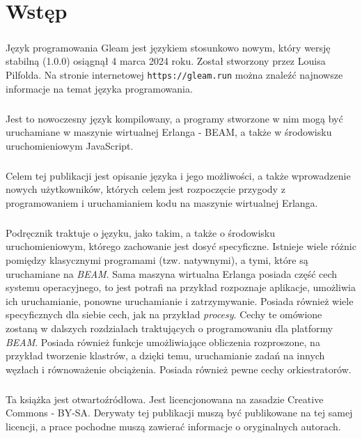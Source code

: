 \chapter{Wstęp}
\paragraph{} Język programowania Gleam jest językiem stosunkowo nowym, który wersję stabilną (1.0.0) osiągnął 4 marca 2024 roku. Został stworzony przez Louisa Pilfolda. Na stronie internetowej  \texttt{https://gleam.run} można znaleźć najnowsze informacje na temat języka programowania.
\paragraph{} Jest to nowoczesny język kompilowany, a programy stworzone w nim mogą być uruchamiane w maszynie wirtualnej Erlanga - BEAM, a także w środowisku uruchomieniowym JavaScript.
\paragraph{} Celem tej publikacji jest opisanie języka i jego możliwości, a także wprowadzenie nowych użytkowników, których celem jest rozpoczęcie przygody z programowaniem i uruchamianiem kodu na maszynie wirtualnej Erlanga. 
\paragraph{} Podręcznik traktuje o języku, jako takim, a także o środowisku uruchomieniowym, którego zachowanie jest dosyć specyficzne. Istnieje wiele różnic pomiędzy klasycznymi programami (tzw. natywnymi), a tymi, które są uruchamiane na \textit{BEAM}. Sama maszyna wirtualna Erlanga posiada część cech systemu operacyjnego, to jest potrafi na przykład rozpoznaje aplikacje, umożliwia ich uruchamianie, ponowne uruchamianie i zatrzymywanie. Posiada również wiele specyficznych dla siebie cech, jak na przykład \textit{procesy}. Cechy te omówione zostaną w dalszych rozdziałach traktujących o programowaniu dla platformy \textit{BEAM}. Posiada również funkcje umożliwiające obliczenia rozproszone, na przykład tworzenie klastrów, a dzięki temu, uruchamianie zadań na innych węzłach i równoważenie obciążenia. Posiada również pewne cechy orkiestratorów. 
\paragraph{} Ta książka jest otwartoźródłowa. Jest licencjonowana na zasadzie Creative Commons - BY-SA. Derywaty tej publikacji muszą być publikowane na tej samej licencji, a prace pochodne muszą zawierać informacje o oryginalnych autorach.